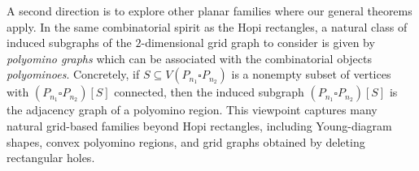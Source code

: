 \documentclass[11pt]{article}
\theoremstyle{plain} \newtheorem{question}{Question}
\newtheorem{cor}[thm]{Corollary}
\theoremstyle{definition}
\newtheorem{prop}[thm]{Proposition}
\begin{document}
\qquad A second direction is to explore other planar families where our general theorems apply. In the same combinatorial spirit as the Hopi rectangles, a natural class of induced subgraphs of the $2$-dimensional grid graph to consider is given by \emph{polyomino graphs} which can be associated with the combinatorial objects \emph{polyominoes}. Concretely, if $S\subseteq V(P_{n_1}\square P_{n_2})$ is a nonempty subset of vertices with $(P_{n_1}\square P_{n_2})[S]$ connected, then the induced subgraph $(P_{n_1}\square P_{n_2})[S]$ is the adjacency graph of a polyomino region. This viewpoint captures many natural grid-based families beyond Hopi rectangles, including Young-diagram shapes, convex polyomino regions, and grid graphs obtained by deleting rectangular holes.













\end{document}
